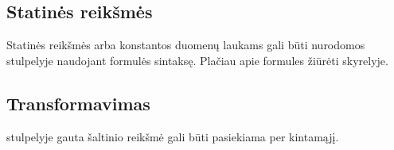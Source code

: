 \documentclass[letterpaper,10pt,lithuanian]{sphinxmanual}
\begin{document}
\begin{fulllineitems}
\begin{fulllineitems}
\end{fulllineitems}


\begin{fulllineitems}
\label{\detokenize{formules:func.monthly}}
\pysigstartsignatures
{}
\pysigstopsignatures
\sphinxAtStartPar
{\hyperref[\detokenize{formules:func.cron}]{}}

\end{fulllineitems}


\begin{fulllineitems}
\label{\detokenize{formules:func.yearly}}
\pysigstartsignatures
{}
\pysigstopsignatures
\sphinxAtStartPar
{\hyperref[\detokenize{formules:func.cron}]{}}

\end{fulllineitems}


\end{fulllineitems}



\subsection{Statinės reikšmės}
\label{\detokenize{formules:statines-reiksmes}}
\sphinxAtStartPar
Statinės reikšmės arba konstantos duomenų laukams gali būti nurodomos
{\hyperref[\detokenize{dimensijos:property.prepare}]{}} stulpelyje naudojant formulės sintaksę. Plačiau apie
formules žiūrėti {\hyperref[\detokenize{formules:formules}]{}} skyrelyje.


\subsection{Transformavimas}
\label{\detokenize{formules:transformavimas}}
\sphinxAtStartPar
{\hyperref[\detokenize{dimensijos:property.prepare}]{}} stulpelyje gauta šaltinio reikšmė gali būti pasiekiama
per  kintamąjį.
\end{document}
